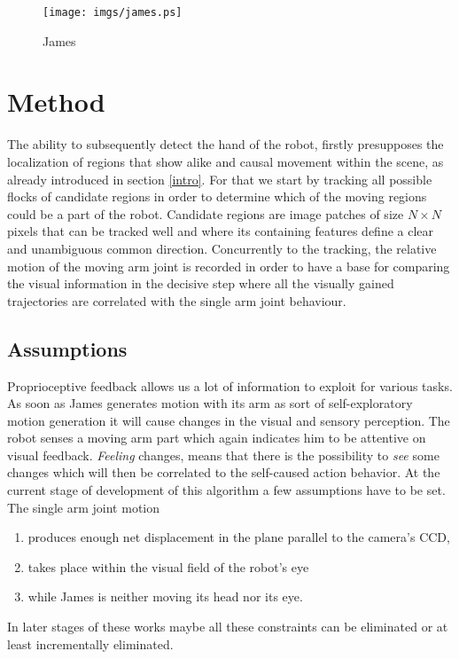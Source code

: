 \documentclass[conference]{IEEEtran}
\begin{document}
\begin{figure}
\centering
\texttt{[image: imgs/james.ps]}
\caption{James}
\label{figJames}
\end{figure}

%
%
\section{Method}\label{method}
The ability to subsequently detect the hand of the robot, firstly presupposes the localization of regions that show alike and causal movement within the scene, as already introduced in section \ref{intro}. For that we start by tracking all possible flocks of candidate regions in order to determine which of the moving regions could be a part of the robot. Candidate regions are image patches of size $N \times N$ pixels that can be tracked well and where its containing features define a clear and unambiguous common direction. Concurrently to the tracking, the relative motion of the moving arm joint is recorded in order to have a base for comparing the visual information in the decisive step where all the visually gained trajectories are correlated with the single arm joint behaviour. 
%
%
%
%
\subsection{Assumptions}\label{method:localization:assumptions}
Proprioceptive feedback allows us a lot of information to exploit for various tasks. As soon as James generates motion with its arm as sort of self-exploratory motion generation it will cause changes in the visual and sensory perception. The robot senses a moving arm part which again indicates him to be attentive on visual feedback. \textit{Feeling} changes, means that there is the possibility to \textit{see} some changes which will then be correlated to the self-caused action behavior. At the current stage of development of this algorithm a few assumptions have to be set. The single arm joint motion
\begin{enumerate}
	\item produces enough net displacement in the plane parallel to the camera's CCD,
	\item takes place within the visual field of the robot's eye
	\item while James is neither moving its head nor its eye.
\end{enumerate}
In later stages of these works maybe all these constraints can be eliminated or at least incrementally eliminated.
\end{document}

